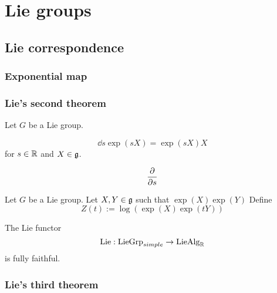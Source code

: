 \documentclass{../../large}
\begin{document}
\part{Lie groups}
\chapter{Lie correspondence}
\section{Exponential map}
\begin{prb}
\end{prb}
\begin{prb}
\end{prb}

\begin{prb}
\end{prb}


\section{Lie's second theorem}
\begin{prb}
Let $G$ be a Lie group.
\begin{parts}
\item
\[\dd{s}\exp(sX)=\exp(sX)X\]
for $s\in\mathbb{R}$ and $X\in\mathfrak{g}$.
\item
\[\pd{s}\]
\end{parts}
\end{prb}

\begin{prb}
Let $G$ be a Lie group.
Let $X,Y\in\mathfrak{g}$ such that $\exp(X)\exp(Y)$
Define
\[Z(t):=\log(\exp(X)\exp(tY))\]
\end{prb}

\begin{prb}[]
\begin{parts}
\item The Lie functor
\[\mathrm{Lie}:\mathrm{LieGrp}_{simple}\to\mathrm{LieAlg}_{\mathbb{R}}\]
is fully faithful.
\end{parts}
\end{prb}


\section{Lie's third theorem}
\begin{prb}
\end{prb}
\end{document}
